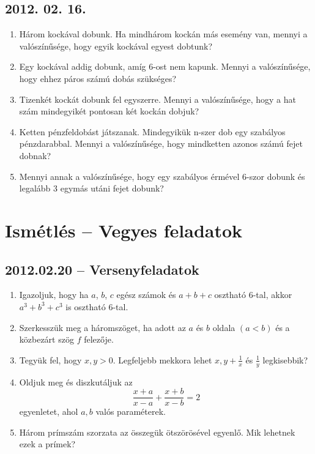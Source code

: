 \subsection*{2012. 02. 16.}
\begin{enumerate}
\item
Három kockával dobunk. Ha mindhárom kockán más esemény van, mennyi a valószínűsége, hogy egyik kockával egyest dobtunk?
\item
Egy kockával addig dobunk, amíg 6-ost nem kapunk. Mennyi a valószínűsége, hogy ehhez páros számú dobás szükséges?
\item
Tizenkét kockát dobunk fel egyszerre. Mennyi a valószínűsége, hogy a hat szám mindegyikét pontosan két kockán dobjuk?
\item
Ketten pénzfeldobást játszanak. Mindegyikük n-szer dob egy szabályos pénzdarabbal. Mennyi a valószínűsége, hogy mindketten azonos számú fejet dobnak?
\item
Mennyi annak a valószínűsége, hogy egy szabályos érmével 6-szor dobunk és legalább 3 egymás utáni fejet dobunk?
\end{enumerate}

	
\section{Ismétlés -- Vegyes feladatok}
\subsection*{2012.02.20 -- Versenyfeladatok}
\begin{enumerate}
\item Igazoljuk, hogy ha $a$, $b$, $c$ egész számok és $a+b+c$ osztható 6-tal, akkor $a^3+b^3+c^3$ is osztható 6-tal.
\item Szerkesszük meg a háromszöget, ha adott az $a$ és $b$ oldala $(a<b)$ és a közbezárt szög $f$ felezője.
\item Tegyük fel, hogy $x,y>0$. Legfeljebb mekkora lehet $x,y+\frac{1}{x}$ és $\frac{1}{y}$ legkisebbik?
\item Oldjuk meg és diszkutáljuk az $$\frac{x+a}{x-a}+\frac{x+b}{x-b}=2$$ egyenletet, ahol $a,b$ valós paraméterek.
\item Három prímszám szorzata az összegük ötszörösével egyenlő. Mik lehetnek ezek a prímek?

\end{enumerate}

